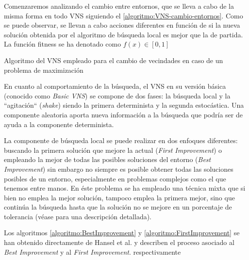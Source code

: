 Comenzaremos analizando el cambio entre entornos, que se lleva a cabo de la misma forma en todo VNS siguiendo el \autoref{algoritmo:VNS-cambio-entornos}. 
Como se puede observar, se llevan a cabo acciones diferentes en función de si la nueva solución obtenida por el algoritmo de búsqueda local es mejor que la de partida. La función fitness se ha denotado como $f(x) \in [0,1]$


\begin{algorithm}[htbp]
	\DontPrintSemicolon
	\medskip

	
	\caption{Algoritmo del VNS empleado para el cambio de vecindades en caso de un problema de maximización}
	\label{algoritmo:VNS-cambio-entornos}
\end{algorithm}

En cuanto al comportamiento de la búsqueda, el VNS en su versión básica (conocido como \textit{Basic VNS}) se compone de dos fases: la búsqueda local y la ``agitación`` (\textit{shake}) siendo la primera determinista y la segunda estocástica. Una componente aleatoria aporta nueva información a la búsqueda que podría ser de ayuda a la componente determinista.

La componente de búsqueda local se puede realizar en dos enfoques diferentes: buscando la primera solución que mejore la actual (\textit{First Improvement}) o empleando la mejor de todas las posibles soluciones del entorno (\textit{Best Improvement}) sin embargo no siempre es posible obtener todas las soluciones posibles de un entorno, especialmente en problemas complejos como el que tenemos entre manos. En éste problema se ha empleado una técnica mixta que si bien no emplea la mejor solución, tampoco emplea la primera mejor, sino que continúa la búsqueda hasta que la solución no se mejore en un porcentaje de tolerancia (véase  para una descripción detallada). %

Los algoritmos \ref{algoritmo:BestImprovement} y \ref{algoritmo:FirstImprovement} se han obtenido directamente de Hansel et al. \cite{vns} y describen el proceso asociado al \textit{Best Improvement} y al \textit{First Improvement}. respectivamente

